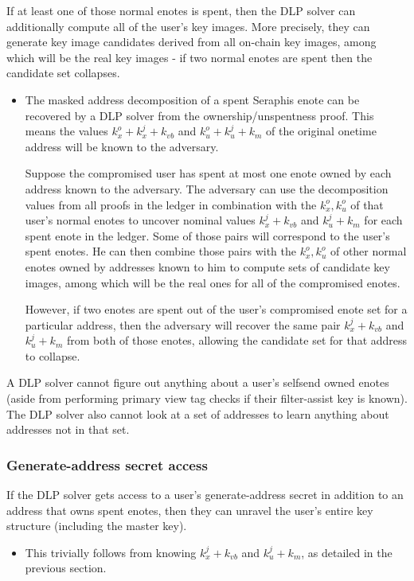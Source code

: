 If at least one of those normal enotes is spent, then the DLP solver can additionally compute all of the user's key images. More precisely, they can generate key image candidates derived from all on-chain key images, among which will be the real key images - if two normal enotes are spent then the candidate set collapses.
\begin{itemize}
    \item The masked address decomposition of a spent Seraphis enote can be recovered by a DLP solver from the ownership/unspentness proof. This means the values $k^o_x + k^j_x + k_{vb}$ and $k^o_u + k^j_u + k_m$ of the original onetime address will be known to the adversary.

    Suppose the compromised user has spent at most one enote owned by each address known to the adversary. The adversary can use the decomposition values from all proofs in the ledger in combination with the $k^o_x, k^o_u$ of that user's normal enotes to uncover nominal values $k^j_x + k_{vb}$ and $k^j_u + k_m$ for each spent enote in the ledger. Some of those pairs will correspond to the user's spent enotes. He can then combine those pairs with the $k^o_x, k^o_u$ of other normal enotes owned by addresses known to him to compute sets of candidate key images, among which will be the real ones for all of the compromised enotes.

    However, if two enotes are spent out of the user's compromised enote set for a particular address, then the adversary will recover the same pair $k^j_x + k_{vb}$ and $k^j_u + k_m$ from both of those enotes, allowing the candidate set for that address to collapse.
\end{itemize}

A DLP solver cannot figure out anything about a user's selfsend owned enotes (aside from performing primary view tag checks if their filter-assist key is known). The DLP solver also cannot look at a set of addresses to learn anything about addresses not in that set.

\subsubsection{Generate-address secret access}
\label{subsubsec:jamtis-forward-secrecy-generate-address-access}

If the DLP solver gets access to a user's generate-address secret in addition to an address that owns spent enotes, then they can unravel the user's entire key structure (including the master key).
\begin{itemize}
    \item This trivially follows from knowing $k^j_x + k_{vb}$ and $k^j_u + k_m$, as detailed in the previous section.
\end{itemize}

